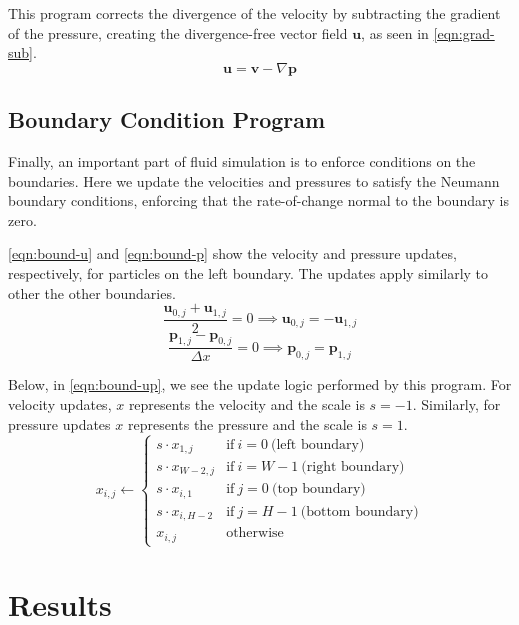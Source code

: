 This program corrects the divergence of the velocity by subtracting the gradient of the pressure,
creating the divergence-free vector field $\bm{u}$, as seen in \autoref{eqn:grad-sub}.
\begin{equation}\label{eqn:grad-sub}
  \bm{u} = \bm{v} - \nabla \bm{p}
\end{equation} 

\subsection{Boundary Condition Program}

Finally, an important part of fluid simulation is to enforce conditions on the boundaries.
Here we update the velocities and pressures to satisfy the Neumann boundary conditions,
enforcing that the rate-of-change normal to the boundary is zero.

\autoref{eqn:bound-u} and \autoref{eqn:bound-p} show the velocity and pressure updates,
respectively, for particles on the left boundary.
The updates apply similarly to other the other boundaries.
\begin{equation}\label{eqn:bound-u}
  \frac{\bm{u}_{0,j}+\bm{u}_{1,j}}{2}=0 \implies \bm{u}_{0,j} = -\bm{u}_{1,j}
\end{equation}
\begin{equation}\label{eqn:bound-p}
  \frac{\bm{p}_{1,j}-\bm{p}_{0,j}}{\Delta x}=0 \implies \bm{p}_{0,j} = \bm{p}_{1,j}
\end{equation}

Below, in \autoref{eqn:bound-up}, we see the update logic performed by this program.
For velocity updates, $x$ represents the velocity and the scale is $s=-1$.
Similarly, for pressure updates $x$ represents the pressure and the scale is $s=1$. 
\begin{equation}\label{eqn:bound-up}
  x_{i,j} \gets \begin{cases}
      s \cdot x_{1,j} & \text{if}\ i=0\ \text{(left boundary)} \\
      s \cdot x_{W-2,j} & \text{if}\ i=W-1\ \text{(right boundary)} \\
      s \cdot x_{i,1} & \text{if}\ j=0\ \text{(top boundary)} \\
      s \cdot x_{i,H-2} & \text{if}\ j=H-1\ \text{(bottom boundary)} \\
      x_{i,j} & \text{otherwise}
  \end{cases}
\end{equation}

\section{Results}


